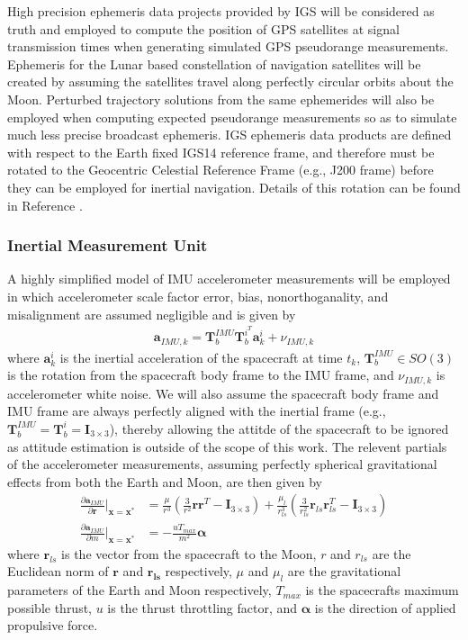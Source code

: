 \documentclass[letterpaper, submit]{AAS}			%
\begin{document}
High precision ephemeris data projects provided by IGS \cite{IGSproducts} will be considered as truth and employed to compute the position of GPS satellites at signal transmission times when generating simulated GPS pseudorange measurements. Ephemeris for the Lunar based constellation of navigation satellites will be created by assuming the satellites travel along perfectly circular orbits about the Moon. Perturbed trajectory solutions from the same ephemerides will also be employed when computing expected pseudorange measurements so as to simulate much less precise broadcast ephemeris. IGS ephemeris data products are defined with respect to the Earth fixed IGS14 reference frame, and therefore must be rotated to the Geocentric Celestial Reference Frame (e.g., J200 frame) before they can be employed for inertial navigation. Details of this rotation can be found in Reference .

\subsubsection{Inertial Measurement Unit}
A highly simplified model of IMU accelerometer measurements will be employed in which accelerometer scale factor error, bias, nonorthoganality, and misalignment are assumed negligible and is given by
\begin{align}
	\mathbf{a}_{IMU,k} = \mathbf{T}_b^{IMU}\mathbf{T}_b^{i^T}\mathbf{a}_k^i + \nu_{IMU,k}
\end{align}
where $\mathbf{a}_k^i$ is the inertial acceleration of the spacecraft at time $t_k$, $\mathbf{T}_b^{IMU}\in SO(3)$ is the rotation from the spacecraft body frame to the IMU frame, and $\nu_{IMU,k}$ is accelerometer white noise. We will also assume the spacecraft body frame and IMU frame are always perfectly aligned with the inertial frame (e.g., $\mathbf{T}_b^{IMU} = \mathbf{T}_b^i = \mathbf{I}_{3\times3}$), thereby allowing the attitde of the spacecraft to be ignored as attitude estimation is outside of the scope of this work. The relevent partials of the accelerometer measurements, assuming perfectly spherical gravitational effects from both the Earth and Moon, are then given by
\begin{align}
	\frac{\partial \mathbf{a}_{IMU}}{\partial \mathbf{r}}\bigg|_{\mathbf{x}=\mathbf{x}^*} &= \frac{\mu}{r^3}\left(\frac{3}{r^2}\mathbf{r}\mathbf{r}^T - \mathbf{I}_{3\times3}\right) + \frac{\mu_l}{r_{ls}^3}\left(\frac{3}{r_{ls}^2}\mathbf{r}_{ls}\mathbf{r}_{ls}^T - \mathbf{I}_{3\times3}\right) \\
	\frac{\partial \mathbf{a}_{IMU}}{\partial m}\bigg|_{\mathbf{x}=\mathbf{x}^*} &= -\frac{u T_{max}}{m^2}\boldsymbol{\alpha}
\end{align}
where $\mathbf{r}_{ls}$ is the vector from the spacecraft to the Moon, $r$ and $r_{ls}$ are the Euclidean norm of $\mathbf{r}$ and $\mathbf{r_{ls}}$ respectively, $\mu$ and $\mu_l$ are the gravitational parameters of the Earth and Moon respectively, $T_{max}$ is the spacecrafts maximum possible thrust, $u$ is the thrust throttling factor, and $\boldsymbol{\alpha}$ is the direction of applied propulsive force.
\end{document}
